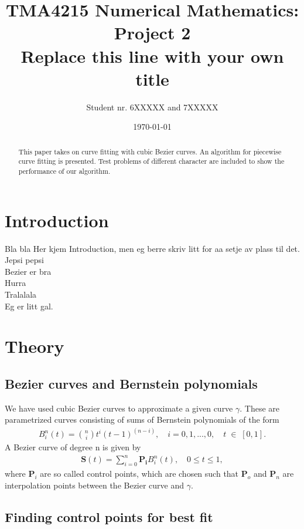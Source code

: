 \documentclass[10pt]{article}
\title{TMA4215 Numerical Mathematics: Project 2 \\ Replace this line with your own title}
\author{Student nr. 6XXXXX and 7XXXXX} %
\date{\today}
\begin{document}
\maketitle
\begin{abstract}
This paper takes on curve fitting with cubic Bezier curves. An algorithm for piecewise curve fitting is presented. Test problems of different character are included to show the performance of our algorithm.
\end{abstract}

\section*{Introduction} 

Bla bla Her kjem Introduction, men eg berre skriv litt for aa setje av plass til det. \\
Jepsi pepsi \\
Bezier er bra \\
Hurra \\
Tralalala \\
Eg er litt gal. \\


\section*{Theory}

\subsection*{Bezier curves and Bernstein polynomials}

We have used cubic Bezier curves to approximate a given curve $\gamma$. These are parametrized curves consisting of sums of Bernstein polynomials of the form
\begin{align}
B_{i}^n(t) = \binom{n}{i}t^i(t-1)^{(n-i)},\quad i = 0, 1, ..., 0,\quad t \; \in \; [0,1].
\end{align}
A Bezier curve of degree n is given by
\begin{align}
\mathbf{S}(t) = \sum_{i=0}^{n} \mathbf{P_i} B_{i}^n(t), \quad 0 \leq t \leq 1,
\end{align}
where $\mathbf{P}_i$ are so called control points, which are chosen such that $\mathbf{P}_o$ and $\mathbf{P}_n$ are interpolation points between the Bezier curve and $\gamma$.


\subsection*{Finding control points for best fit}
\end{document}
